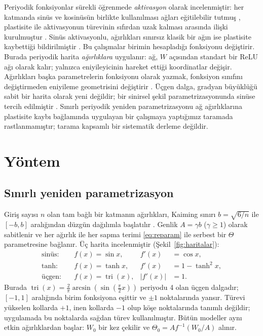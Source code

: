 \documentclass[conference,a4paper]{IEEEtran}
\newcommand{\tri}{\operatorname{tri}}
\begin{document}
Periyodik fonksiyonlar sürekli öğrenmede \emph{aktivasyon} olarak incelenmiştir: her katmanda sinüs ve kosinüsün
birlikte kullanılması ağları eğitilebilir tutmuş \cite{lewandowski2025fourier}, plastisite ile aktivasyonun
türevinin sıfırdan uzak kalması arasında ilişki kurulmuştur \cite{lillo2026activation}. Sinüs aktivasyonlu,
ağırlıkları sınırsız klasik bir ağın ise plastisite kaybettiği bildirilmiştir \cite{chen2026intrinsic}. Bu
çalışmalar birimin hesapladığı fonksiyonu değiştirir. Burada periyodik harita \emph{ağırlıklara} uygulanır: ağ,
$W$ açısından standart bir ReLU ağı olarak kalır; yalnızca eniyileyicinin hareket ettiği koordinatlar değişir.
Ağırlıkları başka parametrelerin fonksiyonu olarak yazmak, fonksiyon sınıfını değiştirmeden eniyileme
geometrisini değiştirir \cite{salimans2016weight}. Üçgen dalga, gradyan büyüklüğü sabit bir harita olarak yeni
değildir; bir sinirsel şekil parametrizasyonunda sinüse tercih edilmiştir \cite{dai2025shaping}. Sınırlı
periyodik yeniden parametrizasyonu ağ ağırlıklarına plastisite kaybı bağlamında uygulayan bir çalışmaya
yaptığımız taramada rastlanmamıştır; tarama kapsamlı bir sistematik derleme değildir.

\section{Yöntem}

\subsection{Sınırlı yeniden parametrizasyon}

Giriş sayısı $n$ olan tam bağlı bir katmanın ağırlıkları, Kaiming sınırı $b=\sqrt{6/n}$ ile $[-b,b]$ aralığından
düzgün dağılımla başlatılır \cite{he2015delving}. Genlik $A=\gamma b$ ($\gamma\ge1$) olarak sabitlenir ve her
ağırlık ile her sapma terimi \eqref{eq:reparam} ile serbest bir $\Theta$ parametresine bağlanır. Üç harita
incelenmiştir (Şekil~\ref{fig:haritalar}):
\begin{align}
  \text{sinüs:}\quad & f(x)=\sin x, & f'(x)&=\cos x, \nonumber\\
  \text{tanh:}\quad & f(x)=\tanh x, & f'(x)&=1-\tanh^2 x, \nonumber\\
  \text{üçgen:}\quad & f(x)=\tri(x), & |f'(x)|&=1 .
\end{align}
Burada $\tri(x)=\tfrac{2}{\pi}\arcsin(\sin(\tfrac{\pi}{2}x))$ periyodu 4 olan üçgen dalgadır; $[-1,1]$
aralığında birim fonksiyona eşittir ve $\pm1$ noktalarında yansır. Türevi yükselen kollarda $+1$, inen kollarda
$-1$ olup köşe noktalarında tanımlı değildir; uygulamada bu noktalarda sağdan türev kullanılmıştır. Bütün
modeller aynı etkin ağırlıklardan başlar: $W_0$ bir kez çekilir ve $\Theta_0=A f^{-1}(W_0/A)$ alınır.
\end{document}
